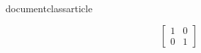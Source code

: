 documentclass{article}
\usepackage{amsmath}

	\begin{equation}
		\left[\begin{matrix}
			1 & 0\\
			0 & 1
		\end{matrix}
	\right]
	\end{equation}
